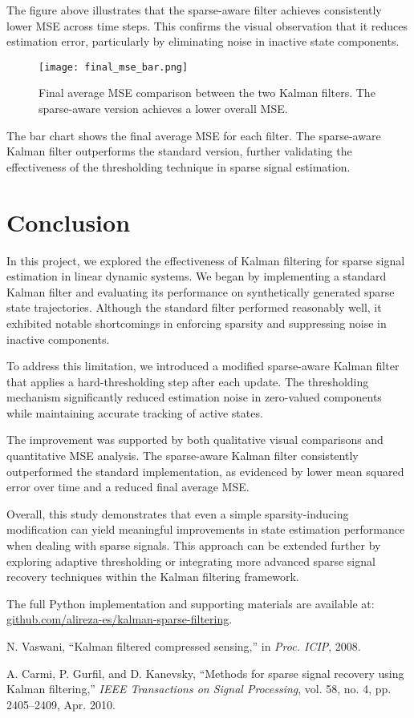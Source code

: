\documentclass[12pt]{article}
\begin{document}
The figure above illustrates that the sparse-aware filter achieves consistently lower MSE across time steps. This confirms the visual observation that it reduces estimation error, particularly by eliminating noise in inactive state components.

\begin{figure}[h!]
  \centering
  \texttt{[image: final\_mse\_bar.png]}
  \caption{Final average MSE comparison between the two Kalman filters. The sparse-aware version achieves a lower overall MSE.}
  \label{fig:mse-final-bar}
\end{figure}

The bar chart shows the final average MSE for each filter. The sparse-aware Kalman filter outperforms the standard version, further validating the effectiveness of the thresholding technique in sparse signal estimation.

\section{Conclusion}

In this project, we explored the effectiveness of Kalman filtering for sparse signal estimation in linear dynamic systems. We began by implementing a standard Kalman filter and evaluating its performance on synthetically generated sparse state trajectories. Although the standard filter performed reasonably well, it exhibited notable shortcomings in enforcing sparsity and suppressing noise in inactive components.

To address this limitation, we introduced a modified sparse-aware Kalman filter that applies a hard-thresholding step after each update. The thresholding mechanism significantly reduced estimation noise in zero-valued components while maintaining accurate tracking of active states.

The improvement was supported by both qualitative visual comparisons and quantitative MSE analysis. The sparse-aware Kalman filter consistently outperformed the standard implementation, as evidenced by lower mean squared error over time and a reduced final average MSE.

Overall, this study demonstrates that even a simple sparsity-inducing modification can yield meaningful improvements in state estimation performance when dealing with sparse signals. This approach can be extended further by exploring adaptive thresholding or integrating more advanced sparse signal recovery techniques within the Kalman filtering framework.

The full Python implementation and supporting materials are available at: \href{https://github.com/alireza-es/kalman-sparse-filtering}{github.com/alireza-es/kalman-sparse-filtering}.



\begin{thebibliography}{1}
N. Vaswani, ``Kalman filtered compressed sensing,'' in 	\textit{Proc. ICIP}, 2008.

A. Carmi, P. Gurfil, and D. Kanevsky, ``Methods for sparse signal recovery using Kalman filtering,'' 	\textit{IEEE Transactions on Signal Processing}, vol. 58, no. 4, pp. 2405--2409, Apr. 2010.
\end{thebibliography}
\end{document}
